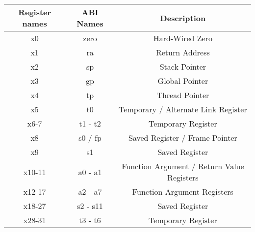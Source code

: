 \begin{table}[H]
  \centering
  \begin{tabular}{c|c|c}
      \toprule
      Register names & ABI Names & Description \\
    \midrule
      x0 & zero & Hard-Wired Zero  \\
      x1 & ra & Return Address  \\
      x2 & sp & Stack Pointer  \\
      x3 & gp & Global Pointer  \\
      x4 & tp & Thread Pointer  \\
      x5 & t0 & Temporary / Alternate Link Register  \\
      x6-7 & t1 - t2 & Temporary Register  \\
      x8 & s0 / fp & Saved Register / Frame Pointer  \\
      x9 & s1 & Saved Register  \\
      x10-11 & a0 - a1 & Function Argument / Return Value Registers  \\
      x12-17 & a2 - a7 & Function Argument Registers  \\
      x18-27 & s2 - s11 & Saved Register  \\
      x28-31 & t3 - t6 & Temporary Register  \\
      \bottomrule
  \end{tabular}
\end{table}